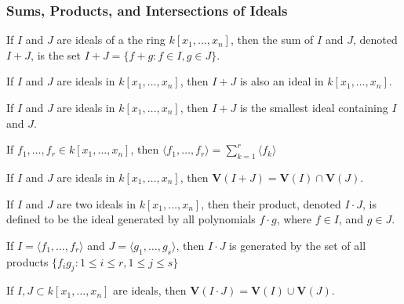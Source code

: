 \documentclass[crop=false,class=article,oneside]{standalone}
\begin{document}
        \subsubsection{Sums, Products, and Intersections of Ideals}
            \begin{definition}
                If $I$ and $J$ are ideals of a the ring
                $k[x_1,\hdots ,x_n]$, then the sum of $I$ and $J$,
                denoted $I+J$, is the set
                $I+J=\{f+g: f\in I, g\in J\}$.
            \end{definition}
            \begin{theorem}
                If $I$ and $J$ are ideals in $k[x_1,\hdots ,x_n]$,
                then $I+J$ is also an ideal in $k[x_1,\hdots ,x_n]$.
            \end{theorem}
            \begin{theorem}
                If $I$ and $J$ are ideals in $k[x_1,\hdots ,x_n]$,
                then $I+J$ is the smallest ideal containing $I$ and $J$.
            \end{theorem}
            \begin{theorem}
                If $f_1,\hdots, f_r \in k[x_1,\hdots ,x_n]$,
                then
                $\langle f_1,\hdots, f_r\rangle%
                 =\sum_{k=1}^{r}\langle f_k\rangle$
            \end{theorem}
            \begin{theorem}
                If $I$ and $J$ are ideals in
                $k[x_1,\hdots ,x_n]$, then
                $\mathbf{V}(I+J)=\mathbf{V}(I)\cap\mathbf{V}(J)$.
            \end{theorem}
            \begin{definition}
                If $I$ and $J$ are two ideals in
                $k[x_1,\hdots ,x_n]$, then their product,
                denoted $I\cdot J$, is defined to be the ideal
                generated by all polynomials $f\cdot g$,
                where $f\in I$, and $g\in J$.
            \end{definition}
            \begin{theorem}
                If $I = \langle f_1,\hdots, f_r\rangle$ and
                $J = \langle g_1,\hdots, g_s\rangle$, then
                $I \cdot J$ is generated by the set of all
                products
                $\{f_ig_j:1\leq i\leq r, 1\leq j \leq s\}$
            \end{theorem}
            \begin{theorem}
                If $I,J\subset k[x_1,\hdots ,x_n]$
                are ideals, then
                $\mathbf{V}(I\cdot J)=\mathbf{V}(I)\cup\mathbf{V}(J)$.
            \end{theorem}
\end{document}
